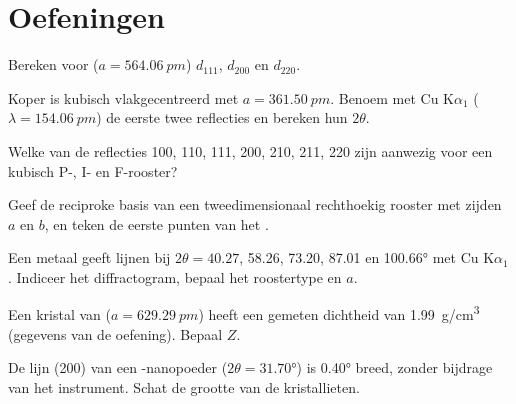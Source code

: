 \section{Oefeningen}

\begin{exercise}[$\star$]\label{exo:b3:x-ray-diffraction:1}
Bereken voor  ($a = \qty{564.06}{pm}$) $d_{111}$, $d_{200}$ en $d_{220}$.
\end{exercise}

\begin{exercise}[$\star$]\label{exo:b3:x-ray-diffraction:2}
Koper is kubisch vlakgecentreerd met $a = \qty{361.50}{pm}$. Benoem met Cu
K$\alpha_1$ ($\lambda = \qty{154.06}{pm}$) de eerste twee reflecties en
bereken hun $2\theta$.
\end{exercise}

\begin{exercise}[$\star$]\label{exo:b3:x-ray-diffraction:3}
Welke van de reflecties 100, 110, 111, 200, 210, 211, 220 zijn aanwezig
voor een kubisch P-, I- en F-rooster?
\end{exercise}

\begin{exercise}[$\star$]\label{exo:b3:x-ray-diffraction:4}
Geef de reciproke basis van een tweedimensionaal rechthoekig rooster met
zijden
$a$ en $b$, en teken de eerste punten van het .
\end{exercise}

\begin{exercise}[$\star\star$]\label{exo:b3:x-ray-diffraction:5}
Een metaal geeft lijnen bij $2\theta = 40.27$, 58.26, 73.20, 87.01 en
\ang{100.66} met Cu
K$\alpha_1$. Indiceer het diffractogram, bepaal het roostertype en $a$.
\end{exercise}

\begin{exercise}[$\star\star$]\label{exo:b3:x-ray-diffraction:6}
Een kristal van  ($a = \qty{629.29}{pm}$) heeft een gemeten
dichtheid van
\qty{1.99}{g/cm^3} (gegevens van de oefening). Bepaal $Z$.
\end{exercise}

\begin{exercise}[$\star\star$]\label{exo:b3:x-ray-diffraction:7}
De lijn (200) van een -nanopoeder ($2\theta = \ang{31.70}$) is
\ang{0.40} breed, zonder bijdrage van het instrument. Schat de grootte van
de kristallieten.
\end{exercise}

